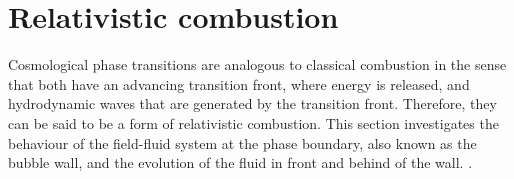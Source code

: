 \section{Relativistic combustion}
\label{relativistic_combustion}
Cosmological phase transitions are analogous to classical combustion in the sense
that both have an advancing transition front,
where energy is released,
and hydrodynamic waves that are generated by the transition front.
Therefore, they can be said to be a form of relativistic combustion.
This section investigates the behaviour of the field-fluid system at the phase boundary,
also known as the bubble wall,
and the evolution of the fluid in front and behind of the wall.
\cites[appendix B]{hindmarsh_gw_pt_2019}{espinosa_energy_2010}{rezzolla_relativistic_2013}[ch. 6]{mazumdar_review_2019}.

